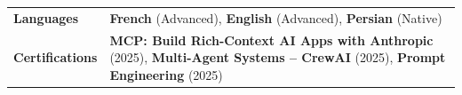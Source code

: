 \documentclass[11pt,a4paper]{article}
\begin{document}
\noindent
\begin{tabularx}{\linewidth}{@{} p{3.2cm} X @{}}
\textbf{Languages} & \textbf{French} (Advanced), \textbf{English} (Advanced), \textbf{Persian} (Native) \\
\textbf{Certifications} & \textbf{MCP: Build Rich-Context AI Apps with Anthropic} (2025), \textbf{Multi-Agent Systems -- CrewAI} (2025), \textbf{Prompt Engineering} (2025) \\
\end{tabularx}
\end{document}
